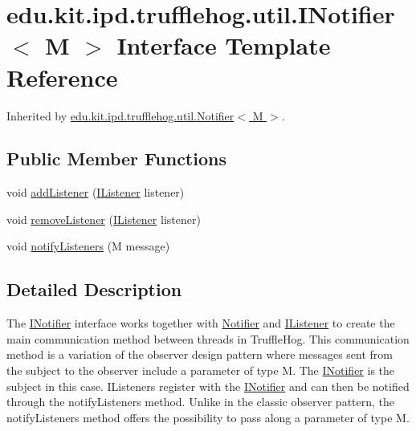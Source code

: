 \hypertarget{interfaceedu_1_1kit_1_1ipd_1_1trufflehog_1_1util_1_1_i_notifier}{}\section{edu.\+kit.\+ipd.\+trufflehog.\+util.\+I\+Notifier$<$ M $>$ Interface Template Reference}
\label{interfaceedu_1_1kit_1_1ipd_1_1trufflehog_1_1util_1_1_i_notifier}


Inherited by \hyperlink{classedu_1_1kit_1_1ipd_1_1trufflehog_1_1util_1_1_notifier}{edu.\+kit.\+ipd.\+trufflehog.\+util.\+Notifier$<$ M $>$}.

\subsection*{Public Member Functions}
\begin{DoxyCompactItemize}
\item 
void \hyperlink{interfaceedu_1_1kit_1_1ipd_1_1trufflehog_1_1util_1_1_i_notifier_a41d2cc10d57c6b0e96bd94ea63725672}{add\+Listener} (\hyperlink{interfaceedu_1_1kit_1_1ipd_1_1trufflehog_1_1util_1_1_i_listener}{I\+Listener} listener)
\item 
void \hyperlink{interfaceedu_1_1kit_1_1ipd_1_1trufflehog_1_1util_1_1_i_notifier_a0a3fef53e52b599133ef1da82596c2e9}{remove\+Listener} (\hyperlink{interfaceedu_1_1kit_1_1ipd_1_1trufflehog_1_1util_1_1_i_listener}{I\+Listener} listener)
\item 
void \hyperlink{interfaceedu_1_1kit_1_1ipd_1_1trufflehog_1_1util_1_1_i_notifier_af6125cfe52e8a8d010c504609a355b25}{notify\+Listeners} (M message)
\end{DoxyCompactItemize}


\subsection{Detailed Description}
The \hyperlink{interfaceedu_1_1kit_1_1ipd_1_1trufflehog_1_1util_1_1_i_notifier}{I\+Notifier} interface works together with \hyperlink{classedu_1_1kit_1_1ipd_1_1trufflehog_1_1util_1_1_notifier}{Notifier} and \hyperlink{interfaceedu_1_1kit_1_1ipd_1_1trufflehog_1_1util_1_1_i_listener}{I\+Listener} to create the main communication method between threads in Truffle\+Hog. This communication method is a variation of the observer design pattern where messages sent from the subject to the observer include a parameter of type M. The \hyperlink{interfaceedu_1_1kit_1_1ipd_1_1trufflehog_1_1util_1_1_i_notifier}{I\+Notifier} is the subject in this case. I\+Listeners register with the \hyperlink{interfaceedu_1_1kit_1_1ipd_1_1trufflehog_1_1util_1_1_i_notifier}{I\+Notifier} and can then be notified through the notify\+Listeners method. Unlike in the classic observer pattern, the notify\+Listeners method offers the possibility to pass along a parameter of type M. 

